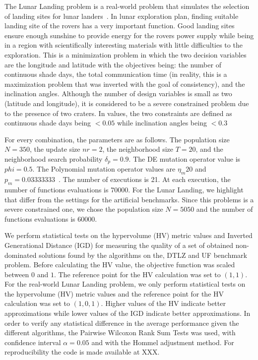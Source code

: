 The Lunar Landing problem is a real-world problem that simulates the selection of landing sites for lunar landers~\citep{MoonOrbitingSatellite2015}. In lunar exploration plan, finding suitable landing site of the rovers has a very important function. Good landing sites ensure enough sunshine to provide energy for the rovers power supply while being in a region with scientifically interesting materials with little difficulties to the exploration. This is a minimization problem in which the two decision variables are the longitude and latitude with the objectives being: the number of continuous shade days, the total communication time (in reality, this is a maximization problem that was inverted with the goal of consistency), and the inclination angles. Although the number of design variables is small as two (latitude and longitude), it is considered to be a severe constrained problem due to the presence of two craters. In values, the two constraints are defined as continuous shade days being $ < 0.05$ while inclination angles being $<0.3$

For every combination, the parameters are as follows. The population size $N = 350$, the update size $nr = 2$, the neighborhood size $T = 20$, and the neighborhood search probability $\delta_p = 0.9$. The DE mutation operator value is $phi=0.5$. The Polynomial mutation operator values are $\eta_m 20$ and $p_m = 0.03333333$~\cite{campelo2018moeadr}. The number of executions is 21. At each execution, the number of functions evaluations is 70000. For the Lunar Landing, we highlight that differ from the settings for the artificial benchmarks. Since this problems is a severe constrained one, we chose the population size $N = 5050$ and the number of functions evaluations is 60000. 

We perform statistical tests on the hypervolume (HV) metric values and Inverted Generational Distance (IGD) for measuring the quality of a set of obtained non-dominated solutions found by the algorithms on the, DTLZ and UF benchmark problem. Before calculating the HV value, the objective function was scaled between $0$ and $1$. The reference point for the HV calculation was set to $(1, 1)$. For the real-world Lunar Landing problem, we only perform statistical tests on the hypervolume (HV) metric values and the reference point for the HV calculation was set to $(1, 0, 1)$. Higher values of the HV indicate better approximations while lower values of the IGD indicate better approximations. In order to verify any statistical difference in the average performance given the different algorithms, the Pairwise Wilcoxon Rank Sum Tests was used, with confidence interval $\alpha = 0.05$ and with the Hommel adjustment method. For reproducibility the code is made available at XXX.

